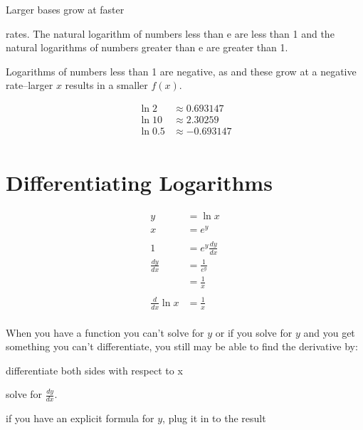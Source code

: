 \documentclass[letterpaper, landscape]{exam}
\begin{document}
  Larger bases grow at faster 
  
  rates. The natural logarithm of numbers less than e are less than 1
  and the natural logarithms of numbers greater than e are greater than 1. 
  
  Logarithms of numbers less than 1 are negative, as and these grow at a negative rate--larger
  $x$ results in a smaller $f(x)$.

  \begin{align*}
    \ln 2   & \approx 0.693147 \\
    \ln 10  & \approx 2.30259 \\
    \ln 0.5 & \approx -0.693147 \\
  \end{align*}

  \section{Differentiating Logarithms} %
  
  \begin{align*}
    y                  & = \ln x \\
    x                  & = e^y \\
    \\
    1                  & = e^y \frac{dy}{dx} \\
    \frac{dy}{dx}      & = \frac{1}{e^y} \\
                       & = \frac{1}{x} \\
    \\
    \frac{d}{dx} \ln x & = \frac{1}{x} \\
  \end{align*}

  When you have a function you can't solve for $y$ or if you solve for $y$ and you get something you
  can't differentiate, you still may be able to find the derivative by:

  \begin{itemize*}
    \item differentiate both sides with respect to x
    \item solve for $\frac{dy}{dx}$.
    \item if you have an explicit formula for $y$, plug it in to the result
  \end{itemize*}
\end{document}

